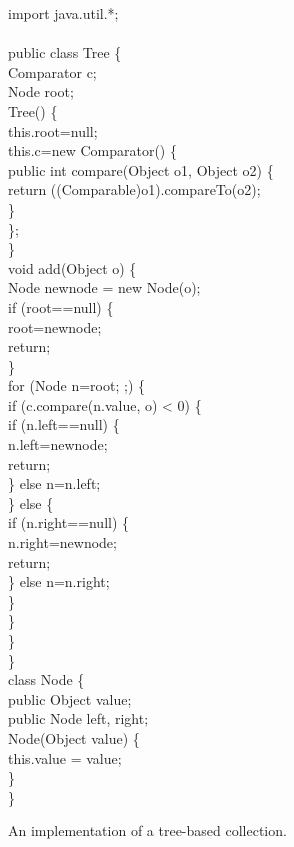 \documentclass[11pt,notitlepage]{article}
\begin{document}
\begin{myfigure}\small
\begin{samplecode}
import java.util.*;\\
\\
public class Tree \{\\
\>Comparator c;\\
\>Node root;\\
\>Tree() \{\\
\>\>this.root=null;\\
\>\>this.c=new Comparator() \{\\
\>\>\>public int compare(Object o1, Object o2) \{\\
\>\>\>\>return ((Comparable)o1).compareTo(o2);\\
\>\>\>\}\\
\>\>\};\\
\>\}\\
\>void add(Object o) \{\\
\>\>Node newnode = new Node(o);\\
\>\>if (root==null) \{\\
\>\>\>root=newnode;\\
\>\>\>return;\\
\>\>\}\\
\>\>for (Node n=root; ;) \{\\
\>\>\>if (c.compare(n.value, o) < 0) \{\\
\>\>\>\>if (n.left==null) \{\\
\>\>\>\>\>n.left=newnode;\\
\>\>\>\>\>return;\\
\>\>\>\>\} else n=n.left;\\
\>\>\>\} else \{\\
\>\>\>\>if (n.right==null) \{\\
\>\>\>\>\>n.right=newnode;\\
\>\>\>\>\>return;\\
\>\>\>\>\} else n=n.right;\\
\>\>\>\}\\
\>\>\}\\
\>\}\\
\}\\
class Node \{\\
\>public Object value;\\
\>public Node left, right;\\
\>Node(Object value) \{\\
\>\>this.value = value;\\
\>\}\\
\}\\
\end{samplecode}
\caption{An implementation of a tree-based collection.}
\label{fig:tree}
\end{myfigure}
\end{document}
